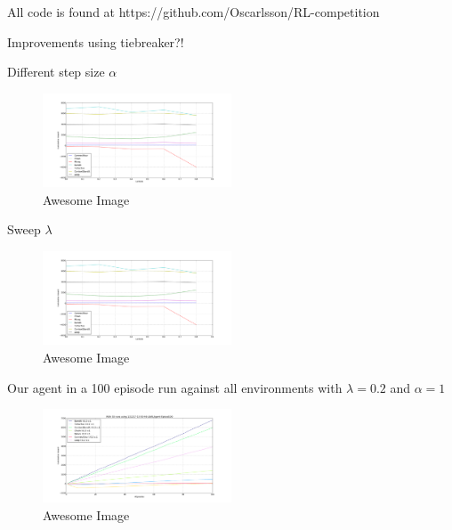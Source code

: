 All code is found at https://github.com/Oscarlsson/RL-competition

Improvements using tiebreaker?!


Different step size $\alpha$
\begin{figure}[h]
    \centering
    \includegraphics[width=0.5\textwidth]{../data/lambdasweepplot.png}
    \caption{Awesome Image}
    \label{fig:awesome_image}
\end{figure}



Sweep $\lambda$
\begin{figure}[h]
    \centering
    \includegraphics[width=0.5\textwidth]{../data/lambdasweepplot.png}
    \caption{Awesome Image}
    \label{fig:awesome_image}
\end{figure}


Our agent in a 100 episode run against all environments with $\lambda = 0.2$ and $\alpha = 1$
\begin{figure}[h]
    \centering
    \includegraphics[width=0.5\textwidth]{../data/100episodes_50runs.png}
    \caption{Awesome Image}
    \label{fig:awesome_image}
\end{figure}
